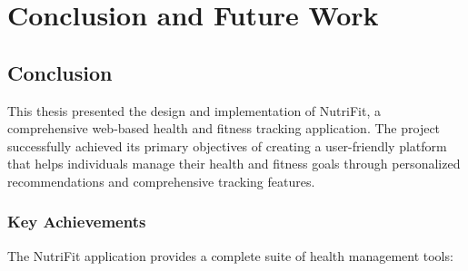 \chapter{Conclusion and Future Work}

\section{Conclusion}

This thesis presented the design and implementation of NutriFit, a comprehensive web-based health and fitness tracking application. The project successfully achieved its primary objectives of creating a user-friendly platform that helps individuals manage their health and fitness goals through personalized recommendations and comprehensive tracking features.

\subsection{Key Achievements}

The NutriFit application provides a complete suite of health management tools:

